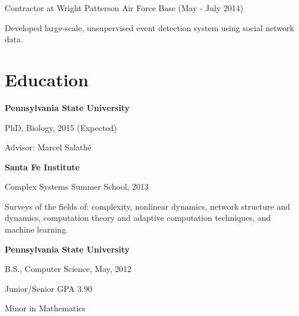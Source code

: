 \documentclass[margin,line]{res}
\newcommand{\linkToUrl}[1]{{\color{blue}\underline{\href{#1}{Link}}}}
\newenvironment{list1}{
  \begin{list}{\ding{113}}{%
      \setlength{\itemsep}{0in}
      \setlength{\parsep}{0in} \setlength{\parskip}{0in}
      \setlength{\topsep}{0in} \setlength{\partopsep}{0in} 
      \setlength{\leftmargin}{0.17in}}}{\end{list}}
\begin{document}
\begin{resume}
Contractor at Wright Patterson Air Force Base (May - July 2014)
\begin{list1}
\item[] Developed large-scale, unsupervised event detection system using social network data.
\end{list1}





\section{\sc Education}
{\bf Pennsylvania State University}\\
\vspace*{-.1in}
\begin{list1}
\item[] PhD, Biology, 2015 (Expected)
\item[] Advisor: Marcel Salath\'e
\end{list1}

{\bf Santa Fe Institute}\\
\vspace*{-.1in}
\begin{list1}
\item[] Complex Systems Summer School, 2013
\item[] Surveys of the fields of: complexity, nonlinear dynamics, network structure and dynamics, computation theory and adaptive computation techniques, and machine learning.
\end{list1}


{\bf Pennsylvania State University} \\
\vspace*{-.1in}
\begin{list1}
\item[] B.S., Computer Science,  May, 2012 
\item[] Junior/Senior GPA 3.90
\item[] Minor in Mathematics
\end{list1}



\end{resume}
\end{document}
